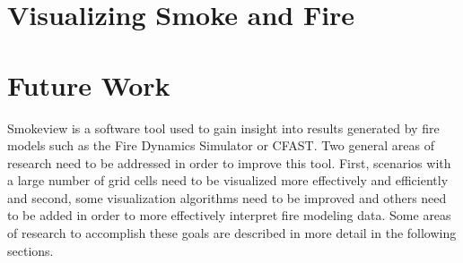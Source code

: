 \documentclass[11pt,twoside]{book}
\newcommand{\feda}{}
\begin{document}
\feda

%
%

\chapter{Visualizing Smoke and Fire}

\newcommand{\citesmv}{\cite{Smokeview_Users_Guide}}
\newcommand{\paper}{chapter}

%
%

\chapter{Future Work}

Smokeview is a software tool used to gain insight into results
generated by fire models such as the Fire Dynamics Simulator or
CFAST. Two general areas of research need to be addressed in order
to improve this tool. First, scenarios with a large number of grid
cells need to be visualized more effectively and efficiently and
second, some visualization algorithms need to be improved and
others need to be added in order to more effectively interpret
fire modeling data. Some areas of research to accomplish these
goals are described in more detail in the following sections.

%
%
\end{document}
